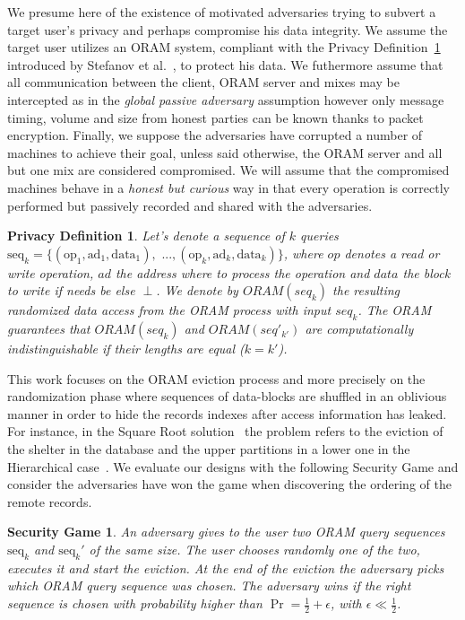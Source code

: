 \documentclass[USenglish,oneside,twocolumn]{article}
\newtheorem{privdef}{Privacy Definition}
\newtheorem*{secgme}{Security Game}
\begin{document}
We presume here of the existence of motivated adversaries trying to subvert a target user's privacy and perhaps compromise his data integrity. We assume the target user utilizes an ORAM system, compliant with the Privacy Definition~\ref{def:Oram} introduced by Stefanov et al.~\cite{stefanov2011towards}, to protect his data.
We futhermore assume that all communication between the client, ORAM server and mixes may be intercepted as in the \textit{global passive adversary} assumption however only message timing, volume and size from honest parties can be known thanks to packet encryption.
Finally, we suppose the adversaries have corrupted a number of machines to achieve their goal, unless said otherwise, the ORAM server and all but one mix are considered compromised. We will assume that the compromised machines behave in a \textit{honest but curious} way in that every operation is correctly performed but passively recorded and shared with the adversaries.

\begin{privdef}\label{def:Oram}
Let's denote a sequence of $k$ queries $\text{seq}_k=\{(\text{op}_1, \text{ad}_1, \text{data}_1), \text{ ...},(\text{op}_k, \text{ad}_k, \text{data}_k)\}$, where $op$ denotes a read or write operation, $ad$ the address where to process the operation and $data$ the block to write if needs be else $\perp$.
We denote by $ORAM(seq_k)$ the resulting randomized data access from the ORAM process with input $seq_k$.
The ORAM guarantees that $ORAM(seq_k)$ and $ORAM(seq'_{k'})$ are computationally indistinguishable if their lengths are equal ($k=k'$).
\end{privdef}

This work focuses on the ORAM eviction process and more precisely on the randomization phase where sequences of data-blocks are shuffled in an oblivious manner in order to hide the records indexes after access information has leaked. For instance, in the Square Root solution~\cite{ostrovsky1990efficient} the problem refers to the eviction of the shelter in the database and the upper partitions in a lower one in the Hierarchical case~\cite{goldreich1996software}. We evaluate our designs with the following Security Game and consider the adversaries have won the game when discovering the ordering of the remote records.

%
\begin{secgme}
An adversary gives to the user two ORAM query sequences $\text{seq}_k$ and $\text{seq}_k'$ of the same size. The user chooses randomly one of the two, executes it and start the eviction. At the end of the eviction the adversary picks which ORAM query sequence was chosen. The adversary wins if the right sequence is chosen with probability higher than $\Pr = \frac{1}{2}+\epsilon$, with $\epsilon\ll\frac{1}{2}$.
\label{def:Game}
\end{secgme} 
%
\end{document}
